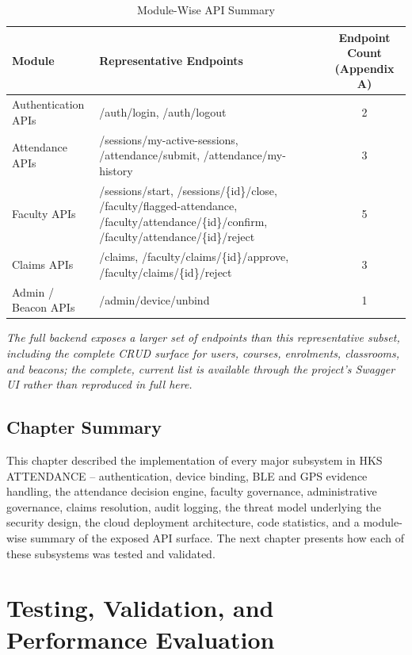 \documentclass[12pt, a4paper, oneside]{report}
\begin{document}
\begin{table}[htbp]
\centering
\caption{Module-Wise API Summary}
\label{tab:module-api}
\begin{tabularx}{\textwidth}{|l|X|c|}
\hline
\textbf{Module} & \textbf{Representative Endpoints} & \textbf{Endpoint Count (Appendix A)} \\
\hline
Authentication APIs & /auth/login, /auth/logout & 2 \\
\hline
Attendance APIs & /sessions/my-active-sessions, /attendance/submit, /attendance/my-history & 3 \\
\hline
Faculty APIs & /sessions/start, /sessions/\{id\}/close, /faculty/flagged-attendance, /faculty/attendance/\{id\}/confirm, /faculty/attendance/\{id\}/reject & 5 \\
\hline
Claims APIs & /claims, /faculty/claims/\{id\}/approve, /faculty/claims/\{id\}/reject & 3 \\
\hline
Admin / Beacon APIs & /admin/device/unbind & 1 \\
\hline
\end{tabularx}
\end{table}

\textit{The full backend exposes a larger set of endpoints than this representative subset, including the complete CRUD surface for users, courses, enrolments, classrooms, and beacons; the complete, current list is available through the project's Swagger UI rather than reproduced in full here.}

\section{Chapter Summary}

This chapter described the implementation of every major subsystem in HKS ATTENDANCE -- authentication, device binding, BLE and GPS evidence handling, the attendance decision engine, faculty governance, administrative governance, claims resolution, audit logging, the threat model underlying the security design, the cloud deployment architecture, code statistics, and a module-wise summary of the exposed API surface. The next chapter presents how each of these subsystems was tested and validated.

\chapter{Testing, Validation, and Performance Evaluation}
\label{chap:testing}
\end{document}
